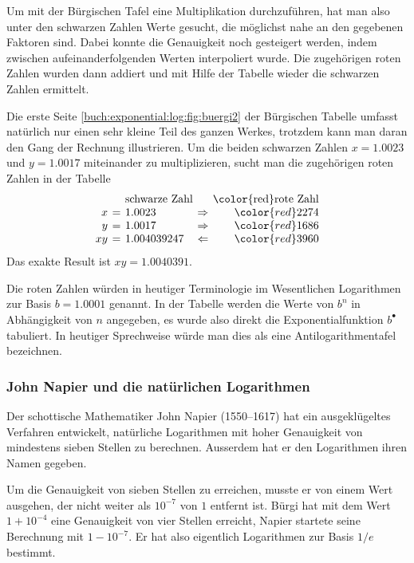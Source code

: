 Um mit der Bürgischen Tafel eine Multiplikation durchzuführen,
hat man also unter den schwarzen Zahlen Werte gesucht,
die möglichst nahe an den gegebenen Faktoren sind.
Dabei konnte die Genauigkeit noch gesteigert werden, indem zwischen
aufeinanderfolgenden Werten interpoliert wurde.
Die zugehörigen roten Zahlen wurden dann addiert und mit Hilfe der
Tabelle wieder die schwarzen Zahlen ermittelt.

\begin{beispiel}
Die erste Seite \ref{buch:exponential:log:fig:buergi2} der Bürgischen
Tabelle umfasst natürlich nur einen sehr kleine Teil des ganzen Werkes,
trotzdem kann man daran den Gang der Rechnung illustrieren.
Um die beiden schwarzen Zahlen $x=1.0023$ und $y=1.0017$ miteinander
zu multiplizieren, sucht man die zugehörigen roten Zahlen in
der Tabelle
\[
\renewcommand{\arraycolsep}{2pt}
\begin{array}{rclcr}
            & &\text{schwarze Zahl}&&\text{{\color{red}rote Zahl}} \\
           x&=&1.0023      &\Rightarrow&{\color{red}2274}\\
           y&=&1.0017      &\Rightarrow&{\color{red}1686}\\
          xy&=&1.004039247 &\Leftarrow &{\color{red}3960}
\end{array}
\]
Das exakte Result ist $xy=1.0040391$.
\end{beispiel}

Die roten Zahlen würden in heutiger Terminologie
im Wesentlichen Logarithmen zur Basis $b=1.0001$ genannt.
In der Tabelle werden die Werte von $b^n$ in Abhängigkeit von $n$
angegeben, es wurde also direkt die Exponentialfunktion $b^\bullet$
tabuliert.
In heutiger Sprechweise würde man dies als eine Antilogarithmentafel
bezeichnen.

%
%
\subsubsection{John Napier und die natürlichen Logarithmen}
Der schottische Mathematiker John Napier (1550--1617) hat ein
ausgeklügeltes Verfahren entwickelt, 
natürliche Logarithmen mit hoher Genauigkeit von mindestens sieben
Stellen zu berechnen.
Ausserdem hat er den Logarithmen ihren Namen gegeben.

Um die Genauigkeit von sieben Stellen zu erreichen, musste er von
einem Wert ausgehen, der nicht weiter als $10^{-7}$ von $1$ entfernt
ist.
Bürgi hat mit dem Wert $1+10^{-4}$ eine Genauigkeit von vier Stellen
erreicht, Napier startete seine Berechnung mit $1-10^{-7}$.
Er hat also eigentlich Logarithmen zur Basis $1/e$ bestimmt.

